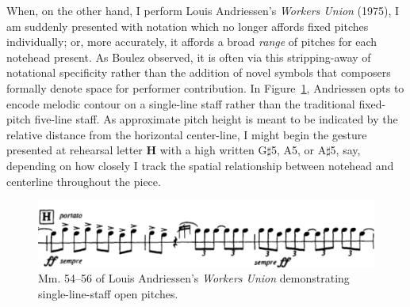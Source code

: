     When, on the other hand, I perform Louis Andriessen's \textit{Workers Union} (1975), I am suddenly presented with notation which no longer affords fixed pitches individually; or, more accurately, it affords a broad \textit{range} of pitches for each notehead present. As Boulez observed, it is often via this stripping-away of notational specificity rather than the addition of novel symbols that composers formally denote space for performer contribution. In Figure~\ref{fig:workersunion}, Andriessen opts to encode melodic contour on a single-line staff rather than the traditional fixed-pitch five-line staff. As approximate pitch height is meant to be indicated by the relative distance from the horizontal center-line, I might begin the gesture presented at rehearsal letter \textbf{H} with a high written G$\sharp$5, A5, or A$\sharp$5, say, depending on how closely I track the spatial relationship between notehead and centerline throughout the piece.

            \begin{figure} 
            \centering
            \includegraphics[width=.9\textwidth]{images/chapter2/workers_union.png}
            \captionsetup{width=.5\textwidth}
            \caption[Mm. 54--56 of Louis Andriessen's \textit{Workers Union} featuring single-line-staff notation denoting open pitches.]{Mm. 54--56 of Louis Andriessen's \textit{Workers Union} demonstrating single-line-staff open pitches.\footnotemark}
            \label{fig:workersunion}
        \end{figure}
        
